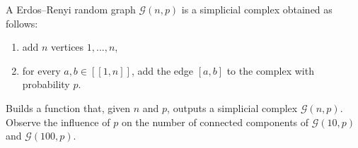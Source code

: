 \begin{exercise}
    A Erdos–Renyi random graph $\mathcal{G}(n, p)$ is a simplicial complex
    obtained as follows:
    \begin{enumerate}
        \item add $n$ vertices $1, ..., n$,
        \item for every $a, b \in [[1, n]]$, add the edge $[a, b]$ to the complex with probability $p$.
    \end{enumerate}

    Builds a function that, given $n$ and $p$, outputs a simplicial complex $\mathcal{G}(n, p)$. Observe
    the influence of $p$ on the number of connected components of $\mathcal{G}(10, p)$ and $\mathcal{G}(100, p)$.
\end{exercise}